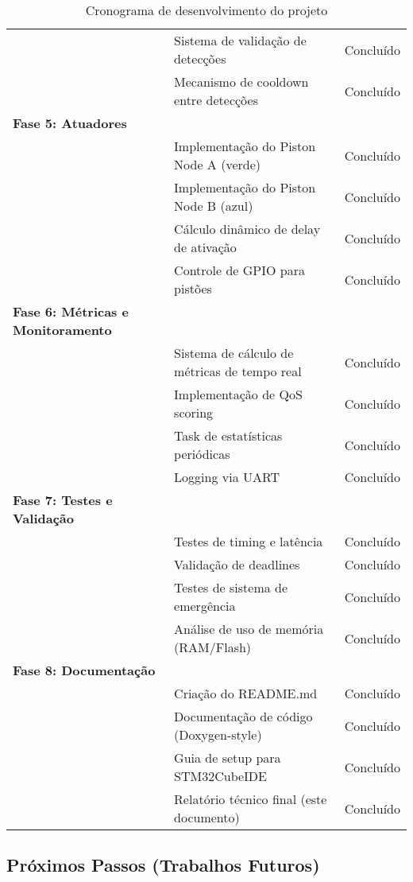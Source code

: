 \documentclass[12pt,a4paper]{article}
\begin{document}
\begin{table}[H]
\begin{tabularx}{\textwidth}{lXl}
& Sistema de validação de detecções & Concluído \\
& Mecanismo de cooldown entre detecções & Concluído \\
\midrule
\textbf{Fase 5: Atuadores} & & \\
& Implementação do Piston Node A (verde) & Concluído \\
& Implementação do Piston Node B (azul) & Concluído \\
& Cálculo dinâmico de delay de ativação & Concluído \\
& Controle de GPIO para pistões & Concluído \\
\midrule
\textbf{Fase 6: Métricas e Monitoramento} & & \\
& Sistema de cálculo de métricas de tempo real & Concluído \\
& Implementação de QoS scoring & Concluído \\
& Task de estatísticas periódicas & Concluído \\
& Logging via UART & Concluído \\
\midrule
\textbf{Fase 7: Testes e Validação} & & \\
& Testes de timing e latência & Concluído \\
& Validação de deadlines & Concluído \\
& Testes de sistema de emergência & Concluído \\
& Análise de uso de memória (RAM/Flash) & Concluído \\
\midrule
\textbf{Fase 8: Documentação} & & \\
& Criação do README.md & Concluído \\
& Documentação de código (Doxygen-style) & Concluído \\
& Guia de setup para STM32CubeIDE & Concluído \\
& Relatório técnico final (este documento) & Concluído \\
\bottomrule
\end{tabularx}
\caption{Cronograma de desenvolvimento do projeto}
\end{table}

\subsection{Próximos Passos (Trabalhos Futuros)}
\end{document}
